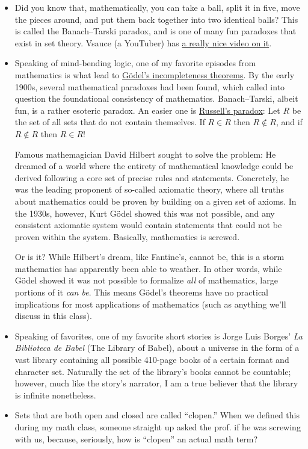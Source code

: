 \documentclass{article}
\theoremstyle{definition}
\begin{document}
\begin{itemize}
  \item Did you know that, mathematically, you can take a ball, split it in five, move the pieces around, and put them back together into two identical balls? This is called the Banach–Tarski paradox, and is one of many fun paradoxes that exist in set theory. Vsauce (a YouTuber) has \href{https://www.youtube.com/watch?v=s86-Z-CbaHA}{a really nice video on it}.

  \item Speaking of mind-bending logic, one of my favorite episodes from mathematics is what lead to \href{https://en.wikipedia.org/wiki/G%C3%B6del%27s_incompleteness_theorems}{Gödel's incompleteness theorems}. By the early 1900s, several mathematical paradoxes had been found, which called into question the foundational consistency of mathematics. Banach–Tarski, albeit fun, is a rather esoteric paradox. An easier one is \href{https://en.wikipedia.org/wiki/Russell%27s_paradox}{Russell's paradox}: Let $R$ be the set of all sets that do not contain themselves. If $R \in R$ then $R \notin R$, and if $R \notin R$ then $R \in R$!

    Famous mathemagician David Hilbert sought to solve the problem: He dreamed of a world where the entirety of mathematical knowledge could be derived following a core set of precise rules and statements. Concretely, he was the leading proponent of so-called axiomatic theory, where all truths about mathematics could be proven by building on a given set of axioms. In the 1930s, however, Kurt Gödel showed this was not possible, and any consistent axiomatic system would contain statements that could not be proven within the system. Basically, mathematics is screwed.

    Or is it? While Hilbert's dream, like Fantine's, cannot be, this is a storm mathematics has apparently been able to weather. In other words, while Gödel showed it was not possible to formalize \textit{all} of mathematics, large portions of it \textit{can be}. This means Gödel's theorems have no practical implications for most applications of mathematics (such as anything we'll discuss in this class).

  \item Speaking of favorites, one of my favorite short stories is Jorge Luis Borges' \textit{La Biblioteca de Babel} (The Library of Babel), about a universe in the form of a vast library containing all possible 410-page books of a certain format and character set. Naturally the set of the library's books cannot be countable; however, much like the story's narrator, I am a true believer that the library is infinite nonetheless.
  
  \item Sets that are both open and closed are called ``clopen.'' When we defined this during my math class, someone straight up asked the prof. if he was screwing with us, because, seriously, how is ``clopen'' an actual math term?
\end{itemize}

\newpage
\printindex
\end{document}
